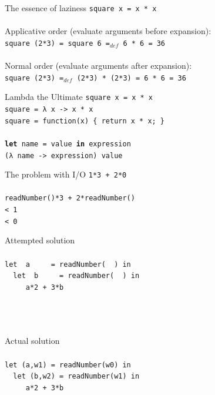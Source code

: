\documentclass{beamer}
\begin{document}
\begin{frame}{The essence of laziness}
  \texttt{square x = x * x} \\ \pause
  \ \\
  Applicative order (evaluate arguments before expansion): \\ \pause
  \texttt{square (2*3) \pause = square 6 \pause =$_{def}$ 6 * 6 \pause = 36} \\ \pause
  \ \\
  Normal order (evaluate arguments after expansion): \\ \pause
  \texttt{square (2*3) \pause =$_{def}$ (2*3) * (2*3) \pause = 6 * 6 \pause = 36}
\end{frame}

\begin{frame}{Lambda the Ultimate}
  \texttt{square x = x * x} \\ \pause
  \texttt{square = λ x -> x * x} \\ \pause
  \texttt{square = function(x) \{ return x * x; \} } \\ \pause
  \ \\
  \texttt{\textbf{let} name = value \textbf{in} expression} \\ \pause
  \texttt{(λ name -> expression) value}
\end{frame}

\begin{frame}{The problem with I/O}
  \texttt{1*3 + 2*0} \\ \pause
  \ \\
  \texttt{readNumber()*3 + 2*readNumber()} \\ \pause
  \texttt{\phantom{}< 1} \\
  \texttt{\phantom{}< 0} \\
\end{frame}

\begin{frame}{Attempted solution}
  \texttt{ \\ \ \\
    let \ a\ \ \ \ \  = readNumber(\ \ ) in \\ \pause
    \ \ let \ b\ \ \ \ \ = readNumber(\ \ ) in \\ \pause
    \ \ \ \ \ a*2 + 3*b
  } \\ \ \\ \ \\ \ 
\end{frame}

\begin{frame}{Actual solution}
  \texttt{ \\ \ \\
    let (a,w1) = readNumber(w0) in \\
    \ \ let (b,w2) = readNumber(w1) in \\
    \ \ \ \ \ a*2 + 3*b
  } \\ \ \\ \ \\ \ 
\end{frame}
\end{document}

